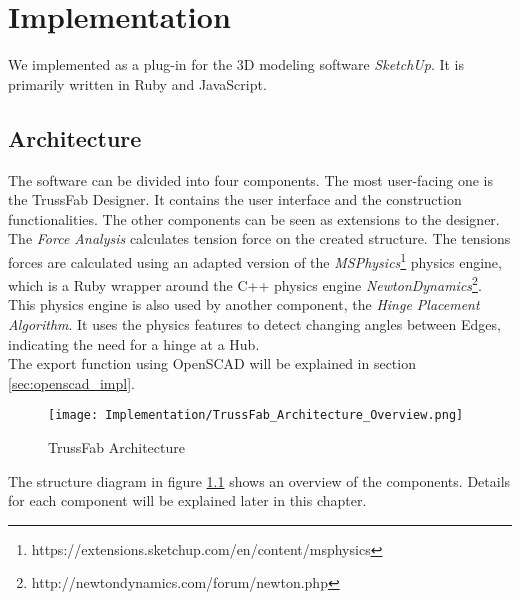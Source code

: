 \chapter{Implementation}\label{ch:implementation}
We implemented \trussFabName{} as a plug-in for the 3D modeling software \textit{SketchUp}. It is primarily written in Ruby and JavaScript.

\section{Architecture}
The software can be divided into four components. The most user-facing one is the TrussFab Designer. It contains the user interface and the construction functionalities. The other components can be seen as extensions to the designer. The \textit{Force Analysis} calculates tension force on the created structure. The tensions forces are calculated using an adapted version of the \textit{MSPhysics}\footnote{https://extensions.sketchup.com/en/content/msphysics} physics engine, which is a Ruby wrapper around the C++ physics engine \textit{NewtonDynamics}\footnote{http://newtondynamics.com/forum/newton.php}.\\
This physics engine is also used by another component, the \textit{Hinge Placement Algorithm}. It uses the physics features to detect changing angles between Edges, indicating the need for a hinge at a Hub.\\
The export function using OpenSCAD will be explained in section \ref{sec:openscad_impl}.
\begin{figure}[!h]
    \texttt{[image: Implementation/TrussFab\_Architecture\_Overview.png]}
    \centering
    \caption{TrussFab Architecture}
    \label{fig:architecture}
\end{figure}
The structure diagram in figure \ref{fig:architecture} shows an overview of the components. Details for each component will be explained later in this chapter.

